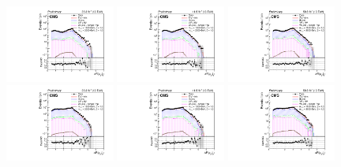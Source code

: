 \begin{figure}[H]
       {\includegraphics[width=0.32\textwidth]{Images/Analysis/Results_2016_Unblinded/Plots/Preselection/BasicLQ_uujj_DR_muon2jet1_standard.pdf}}
       {\includegraphics[width=0.32\textwidth]{Images/Analysis/Results_2017_Unblinded/Plots/Preselection/BasicLQ_uujj_DR_muon2jet1_standard.pdf}}
       {\includegraphics[width=0.32\textwidth]{Images/Analysis/Results_2018_Unblinded/Plots/Preselection/BasicLQ_uujj_DR_muon2jet1_standard.pdf}}
       {\includegraphics[width=0.32\textwidth]{Images/Analysis/Results_2016_Unblinded/Plots/Preselection/BasicLQ_uujj_DR_muon2jet2_standard.pdf}}
       {\includegraphics[width=0.32\textwidth]{Images/Analysis/Results_2017_Unblinded/Plots/Preselection/BasicLQ_uujj_DR_muon2jet2_standard.pdf}}
       {\includegraphics[width=0.32\textwidth]{Images/Analysis/Results_2018_Unblinded/Plots/Preselection/BasicLQ_uujj_DR_muon2jet2_standard.pdf}}

\end{figure}
